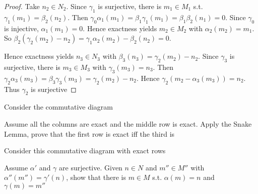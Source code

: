 \documentclass[11pt]{article}
\begin{document}
\begin{proof}
Take \(n_2\in N_2\). Since \(\gamma_1\) is surjective, there is \(m_1\in
   M_1\) s.t. \(\gamma_1(m_1)=\beta_2(n_2)\). Then
\(\gamma_0\alpha_1(m_1)=\beta_1\gamma_1(m_1)=\beta_1\beta_2(n_1)=0\). Since
\(\gamma_0\) is injective, \(\alpha_1(m_1)=0\). Hence exactness yields
\(m_2\in M_2\) with \(\alpha_2(m_2)=m_1\). So
\(\beta_2(\gamma_2(m_2)-n_2)=\gamma_1\alpha_2(m_2)-\beta_2(n_2)=0\).

Hence exactness yields \(n_3\in N_3\) with
\(\beta_3(n_3)=\gamma_2(m_2)-n_2\). Since \(\gamma_3\) is surjective, there
is \(m_3\in M_3\) with \(\gamma_3(m_3)=n_3\). Then
\(\gamma_2\alpha_3(m_3)=\beta_3\gamma_3(m_3)=\gamma_2(m_2)-n_2\). Hence
\(\gamma_2(m_2-\alpha_3(m_3))=n_2\). Thus \(\gamma_2\) is surjective
\end{proof}

\begin{exercise}
\label{5.15}
Consider the commutative diagram
\begin{center}
\end{center}
Assume all the columns are exact and the middle row is exact. Apply the Snake
Lemma, prove that the first row is exact iff the third is
\end{exercise}

\begin{exercise}
\label{5.16}
Consider this commutative diagram with exact rows
\begin{center}
\end{center}
Assume \(\alpha'\) and \(\gamma\) are surjective. Given \(n\in N\) and \(m''\in M''\)
with \(\alpha''(m'')=\gamma'(n)\), show that there is \(m\in M\) s.t.
\(\alpha(m)=n\) and \(\gamma(m)=m''\)
\end{exercise}
\end{document}
